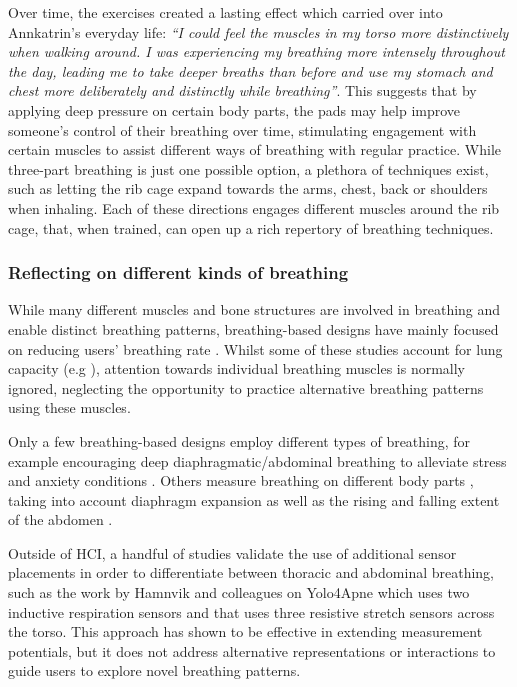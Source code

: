 Over time, the exercises created a lasting effect which carried over into Annkatrin's everyday life: \textit{``I could feel the muscles in my torso more distinctively when walking around. I was experiencing my breathing more intensely throughout the day, leading me to take deeper breaths than before and use my stomach and chest more deliberately and distinctly while breathing''}. This suggests that by applying deep pressure on certain body parts, the pads may help improve someone's control of their breathing over time, stimulating engagement with certain muscles to assist different ways of breathing with regular practice. While three-part breathing is just one possible option, a plethora of techniques exist, such as letting the rib cage expand towards the arms, chest, back or shoulders when inhaling. Each of these directions engages different muscles around the rib cage, that, when trained, can open up a rich repertory of breathing techniques.
%

\subsubsection*{Reflecting on different kinds of breathing}

While many different muscles and bone structures are involved in breathing and enable distinct breathing patterns, breathing-based designs have mainly focused on reducing users' breathing rate \cite{prpa_inhaling_2020}. Whilst some of these studies account for lung capacity (e.g \cite{abushakra_augmenting_2014}), attention towards individual breathing muscles is normally ignored, neglecting the opportunity to practice alternative breathing patterns using these muscles.

Only a few breathing-based designs employ different types of breathing, for example encouraging deep diaphragmatic/abdominal breathing to alleviate stress \cite{prpa_hacking_2016} and anxiety conditions \cite{van_rooij_deep_2016}. Others measure breathing on different body parts \cite{prpa_attending_2018}, taking into account diaphragm expansion \cite{desnoyers-stewart_jel_2019} as well as the rising and falling extent of the abdomen \cite{schnadelbach_exobuilding_2012}.

Outside of HCI, a handful of studies validate the use of additional sensor placements in order to differentiate between thoracic and abdominal breathing, such as the work by Hamnvik and colleagues on Yolo4Apne \cite{hamnvik_yolo4apnea_2020} which uses two inductive respiration sensors and \cite{ejupi_detection_2018} that uses three resistive stretch sensors across the torso. This approach has shown to be effective in extending measurement potentials, but it does not address alternative representations or interactions to guide users to explore novel breathing patterns.


